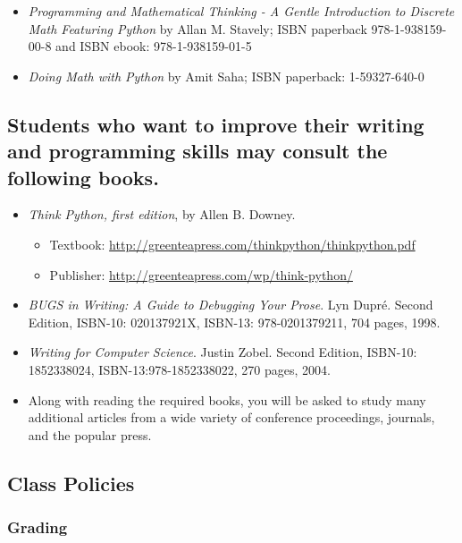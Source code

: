 \documentclass[11pt]{article} %
\begin{document}
\begin{itemize}
  \item {\em Programming and Mathematical Thinking - A Gentle Introduction to Discrete Math Featuring Python} by Allan M. Stavely; ISBN paperback 978-1-938159-00-8 and ISBN ebook: 978-1-938159-01-5
  \item {\em Doing Math with Python} by Amit Saha; ISBN paperback: 1-59327-640-0

\end{itemize}

\subsection*{Students who want to improve their writing and programming skills may consult the following books.}

\begin{itemize}

\item \emph{Think Python, first edition}, by Allen B. Downey.
	\begin{itemize}
		\item Textbook: \url{http://greenteapress.com/thinkpython/thinkpython.pdf}
		\item Publisher: \url{http://greenteapress.com/wp/think-python/}
	\end{itemize}

\item {\em BUGS in Writing: A Guide to Debugging Your Prose}. Lyn Dupr\'e. Second Edition,  ISBN-10: 020137921X,
ISBN-13: 978-0201379211, 704 pages, 1998.

\item {\em Writing for Computer Science}.  Justin Zobel. Second Edition,  ISBN-10: 1852338024, ISBN-13:978-1852338022, 270 pages, 2004.

\item Along with reading the required books, you will be asked to study many additional articles from a wide variety of conference proceedings, journals, and the popular press.
\end{itemize}

\subsection*{Class Policies}

\subsubsection*{Grading}
\end{document}
